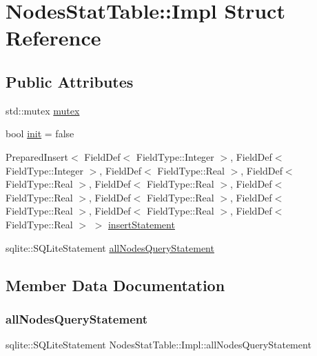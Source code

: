 \hypertarget{struct_nodes_stat_table_1_1_impl}{}\section{Nodes\+Stat\+Table\+::Impl Struct Reference}
\label{struct_nodes_stat_table_1_1_impl}
\subsection*{Public Attributes}
\begin{DoxyCompactItemize}
\item 
std\+::mutex \mbox{\hyperlink{struct_nodes_stat_table_1_1_impl_aada6698f52748c60bf687c35df59bba5}{mutex}}
\item 
bool \mbox{\hyperlink{struct_nodes_stat_table_1_1_impl_a9b36da64b39ad87cffd19c5b374efe1b}{init}} = false
\item 
Prepared\+Insert$<$ Field\+Def$<$ Field\+Type\+::\+Integer $>$, Field\+Def$<$ Field\+Type\+::\+Integer $>$, Field\+Def$<$ Field\+Type\+::\+Real $>$, Field\+Def$<$ Field\+Type\+::\+Real $>$, Field\+Def$<$ Field\+Type\+::\+Real $>$, Field\+Def$<$ Field\+Type\+::\+Real $>$, Field\+Def$<$ Field\+Type\+::\+Real $>$, Field\+Def$<$ Field\+Type\+::\+Real $>$, Field\+Def$<$ Field\+Type\+::\+Real $>$, Field\+Def$<$ Field\+Type\+::\+Real $>$ $>$ \mbox{\hyperlink{struct_nodes_stat_table_1_1_impl_aab28521342ff3e319b9451fb42a2c857}{insert\+Statement}}
\item 
sqlite\+::\+S\+Q\+Lite\+Statement \mbox{\hyperlink{struct_nodes_stat_table_1_1_impl_a082d42a1f982d118a3ed501470ea5332}{all\+Nodes\+Query\+Statement}}
\end{DoxyCompactItemize}


\subsection{Member Data Documentation}
\mbox{\label{struct_nodes_stat_table_1_1_impl_a082d42a1f982d118a3ed501470ea5332}} 
\subsubsection{\texorpdfstring{allNodesQueryStatement}{allNodesQueryStatement}}
{\footnotesize\ttfamily sqlite\+::\+S\+Q\+Lite\+Statement Nodes\+Stat\+Table\+::\+Impl\+::all\+Nodes\+Query\+Statement}

